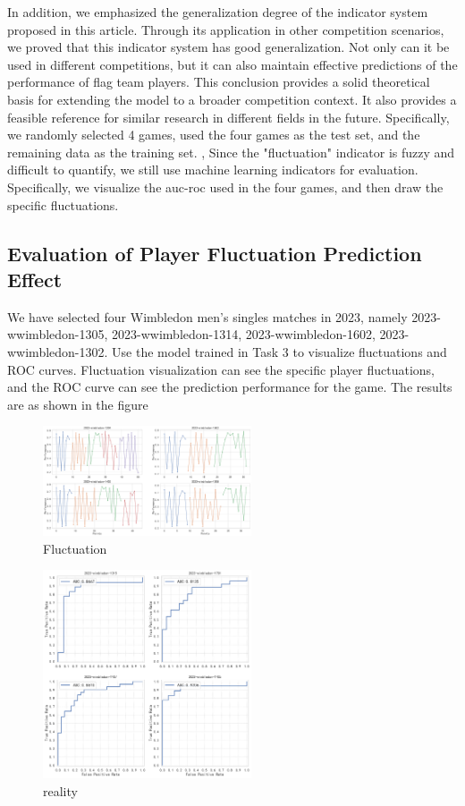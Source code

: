 \documentclass[12pt]{article}
\begin{document}
In addition, we emphasized the generalization degree of the indicator system proposed in this article. Through its application in other competition scenarios, we proved that this indicator system has good generalization. Not only can it be used in different competitions,
but it can also maintain effective predictions of the performance of flag team players. This conclusion provides a solid theoretical basis for extending the model to a broader competition context. It also provides a feasible reference for similar research in different fields in the future. Specifically,
we randomly selected 4 games, used the four games as the test set, and the remaining data as the training set. , Since the "fluctuation" indicator is fuzzy and difficult to quantify, we still use machine learning indicators for evaluation. Specifically, we visualize the auc-roc used in the four games, and then draw the specific fluctuations.

\subsection{Evaluation of Player Fluctuation Prediction Effect}
We have selected four Wimbledon men's singles matches in 2023, namely 2023-wwimbledon-1305, 2023-wwimbledon-1314, 2023-wwimbledon-1602, 2023-wwimbledon-1302. Use the model trained in Task 3 to visualize fluctuations and ROC curves. Fluctuation visualization can see the specific player fluctuations, and the ROC curve can see the prediction performance for the game. The results are as shown in the figure
\begin{figure}[H]
      \centering
      \includegraphics[width=0.55\textwidth]{fluctuation.png}
      \caption{Fluctuation}
\end{figure}
\begin{figure}[H]
      \centering
      \includegraphics[width=0.55\textwidth]{reality.png}
\caption{reality}
\end{figure}
\end{document}
